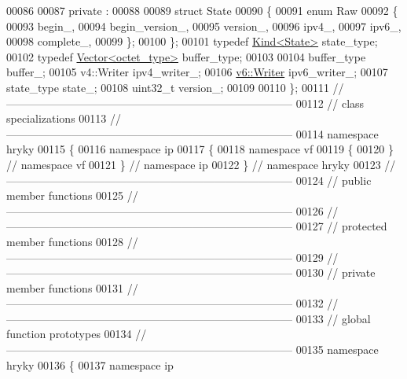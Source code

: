 \begin{DoxyCode}
00086 
00087 \textcolor{keyword}{private} :
00088 
00089     \textcolor{keyword}{struct }State
00090     \{
00091         \textcolor{keyword}{enum} Raw
00092         \{
00093             begin\_,
00094             begin\_version\_,
00095             version\_,
00096             ipv4\_,
00097             ipv6\_,
00098             complete\_,
00099         \};
00100     \};
00101     \textcolor{keyword}{typedef} \hyperlink{classhryky_1_1_kind}{Kind<State>} state\_type;
00102     \textcolor{keyword}{typedef} \hyperlink{classhryky_1_1_vector}{Vector<octet_type>} buffer\_type;
00103 
00104     buffer\_type buffer\_;
00105     v4::Writer  ipv4\_writer\_;
00106     \hyperlink{classhryky_1_1ip_1_1v6_1_1_writer}{v6::Writer}  ipv6\_writer\_;
00107     state\_type  state\_;
00108     uint32\_t    version\_;
00109 
00110 \};
00111 \textcolor{comment}{//
      ------------------------------------------------------------------------------}
00112 \textcolor{comment}{// class specializations}
00113 \textcolor{comment}{//
      ------------------------------------------------------------------------------}
00114 \textcolor{keyword}{namespace }hryky
00115 \{
00116 \textcolor{keyword}{namespace }ip
00117 \{
00118 \textcolor{keyword}{namespace }vf
00119 \{
00120 \} \textcolor{comment}{// namespace vf}
00121 \} \textcolor{comment}{// namespace ip}
00122 \} \textcolor{comment}{// namespace hryky}
00123 \textcolor{comment}{//
      ------------------------------------------------------------------------------}
00124 \textcolor{comment}{// public member functions}
00125 \textcolor{comment}{//
      ------------------------------------------------------------------------------}
00126 \textcolor{comment}{//
      ------------------------------------------------------------------------------}
00127 \textcolor{comment}{// protected member functions}
00128 \textcolor{comment}{//
      ------------------------------------------------------------------------------}
00129 \textcolor{comment}{//
      ------------------------------------------------------------------------------}
00130 \textcolor{comment}{// private member functions}
00131 \textcolor{comment}{//
      ------------------------------------------------------------------------------}
00132 \textcolor{comment}{//
      ------------------------------------------------------------------------------}
00133 \textcolor{comment}{// global function prototypes}
00134 \textcolor{comment}{//
      ------------------------------------------------------------------------------}
00135 \textcolor{keyword}{namespace }hryky
00136 \{
00137 \textcolor{keyword}{namespace }ip

\end{DoxyCode}
